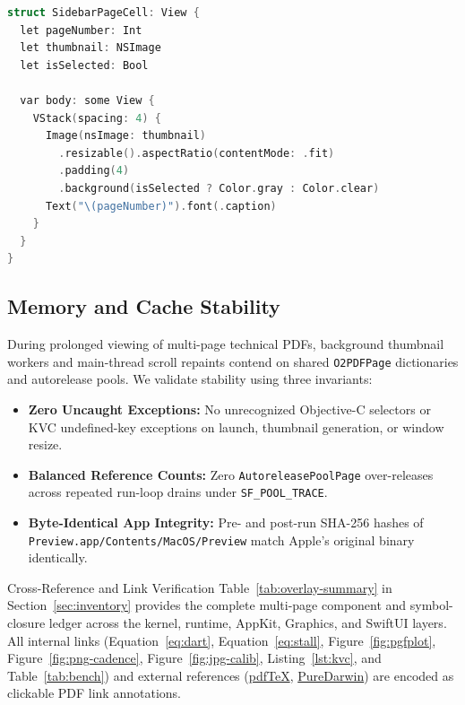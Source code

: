 \documentclass[10pt,twocolumn,letterpaper]{article}
\begin{document}
\begin{lstlisting}[language=C,caption={Representative SwiftUI sidebar-item layout mirroring Preview's thumbnail host.},label={lst:swift}]
struct SidebarPageCell: View {
  let pageNumber: Int
  let thumbnail: NSImage
  let isSelected: Bool

  var body: some View {
    VStack(spacing: 4) {
      Image(nsImage: thumbnail)
        .resizable().aspectRatio(contentMode: .fit)
        .padding(4)
        .background(isSelected ? Color.gray : Color.clear)
      Text("\(pageNumber)").font(.caption)
    }
  }
}
\end{lstlisting}

\subsection{Memory and Cache Stability}
During prolonged viewing of multi-page technical PDFs, background thumbnail workers and main-thread scroll repaints contend on shared \texttt{O2PDFPage} dictionaries and autorelease pools. We validate stability using three invariants:
\begin{itemize}[leftmargin=12pt,itemsep=2pt,topsep=3pt]
  \item \textbf{Zero Uncaught Exceptions:} No unrecognized Objective-C selectors or KVC undefined-key exceptions on launch, thumbnail generation, or window resize.
  \item \textbf{Balanced Reference Counts:} Zero \texttt{AutoreleasePoolPage} over-releases across repeated run-loop drains under \texttt{SF\_POOL\_TRACE}.
  \item \textbf{Byte-Identical App Integrity:} Pre- and post-run SHA-256 hashes of \texttt{Preview.app/Contents/MacOS/Preview} match Apple's original binary identically.
\end{itemize}

\begin{sfnote}{Cross-Reference and Link Verification}
Table~\ref{tab:overlay-summary} in Section~\ref{sec:inventory} provides the complete multi-page component and symbol-closure ledger across the kernel, runtime, AppKit, Graphics, and SwiftUI layers. All internal links (Equation~\ref{eq:dart}, Equation~\ref{eq:stall}, Figure~\ref{fig:pgfplot}, Figure~\ref{fig:png-cadence}, Figure~\ref{fig:jpg-calib}, Listing~\ref{lst:kvc}, and Table~\ref{tab:bench}) and external references (\href{https://www.tug.org/applications/pdftex/}{pdfTeX}, \href{https://puredarwin.org}{PureDarwin}) are encoded as clickable PDF link annotations.
\end{sfnote}
\end{document}
